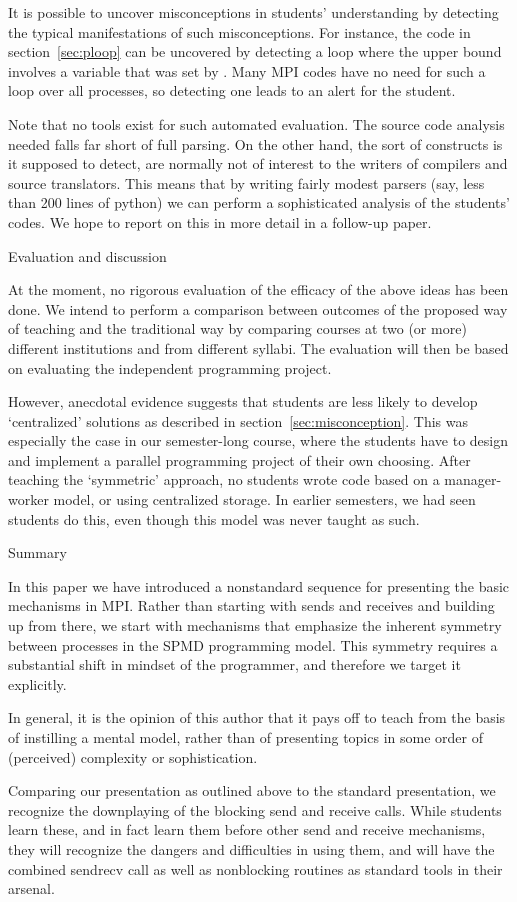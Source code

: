 It is possible to uncover misconceptions in students' understanding by
detecting the typical manifestations of such misconceptions. For
instance, the code in section~\ref{sec:ploop} can be uncovered by
detecting a loop where the upper bound involves a variable that was
set by . Many MPI codes have no need for such a loop
over all processes, so detecting one leads to an alert for the
student.

Note that no tools exist for such automated evaluation. The source
code analysis needed falls far short of full parsing. On the other
hand, the sort of constructs is it supposed to detect, are normally
not of interest to the writers of compilers and source
translators. This means that by writing fairly modest parsers (say,
less than 200 lines of python) we can perform a sophisticated analysis
of the students' codes. We hope to report on this in more detail in a
follow-up paper.

 {Evaluation and discussion}
\label{sec:eval}

At the moment,
no rigorous evaluation of the efficacy of the above ideas has been
done.
We intend to perform a
comparison between outcomes of the proposed way of teaching and the
traditional way by comparing courses at two (or more) different
institutions and from different syllabi. The evaluation will
then be based on evaluating the independent programming project.

However, anecdotal evidence suggests that students are less likely to
develop `centralized' solutions as described in
section~\ref{sec:misconception}. This was especially the case in our
semester-long course, where the students have to design and implement a parallel
programming project of their own choosing. After teaching the
`symmetric' approach, no students wrote code based on a manager-worker
model, or using centralized storage. In earlier semesters, we had seen
students do this, even though this model was never taught as such.

 {Summary}
\label{sec:summary}

In this paper we have introduced a nonstandard sequence for presenting
the basic mechanisms in MPI. Rather than starting with sends and receives and building
up from there, we start with mechanisms that emphasize the inherent symmetry between
processes in the \ac{SPMD} programming model. This symmetry requires a substantial
shift in mindset of the programmer, and therefore we target it explicitly.

In general, it is the opinion of this author that it pays off to teach
from the basis of instilling a mental model, rather than of presenting
topics in some order of (perceived) complexity or sophistication.

Comparing our presentation as outlined above to the standard presentation, we
recognize the downplaying of the blocking send and receive calls. While students
learn these, and in fact learn them before other send and receive mechanisms,
they will recognize the dangers and difficulties in using them, and
will have the combined sendrecv call as well as nonblocking routines
as standard tools in their arsenal.

